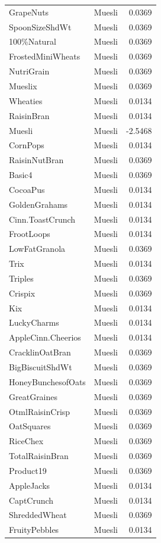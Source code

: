 \begin{longtable}{llr}
GrapeNuts & Muesli & 0.0369 \\
SpoonSizeShdWt & Muesli & 0.0369 \\
100\%Natural & Muesli & 0.0369 \\
FrostedMiniWheats & Muesli & 0.0369 \\
NutriGrain & Muesli & 0.0369 \\
Mueslix & Muesli & 0.0369 \\
Wheaties & Muesli & 0.0134 \\
RaisinBran & Muesli & 0.0134 \\
Muesli & Muesli & -2.5468 \\
CornPops & Muesli & 0.0134 \\
RaisinNutBran & Muesli & 0.0369 \\
Basic4 & Muesli & 0.0369 \\
CocoaPus & Muesli & 0.0134 \\
GoldenGrahams & Muesli & 0.0134 \\
Cinn.ToastCrunch & Muesli & 0.0134 \\
FrootLoops & Muesli & 0.0134 \\
LowFatGranola & Muesli & 0.0369 \\
Trix & Muesli & 0.0134 \\
Triples & Muesli & 0.0369 \\
Crispix & Muesli & 0.0369 \\
Kix & Muesli & 0.0134 \\
LuckyCharms & Muesli & 0.0134 \\
AppleCinn.Cheerios & Muesli & 0.0134 \\
CracklinOatBran & Muesli & 0.0369 \\
BigBiscuitShdWt & Muesli & 0.0369 \\
HoneyBunchesofOats & Muesli & 0.0369 \\
GreatGraines & Muesli & 0.0369 \\
OtmlRaisinCrisp & Muesli & 0.0369 \\
OatSquares & Muesli & 0.0369 \\
RiceChex & Muesli & 0.0369 \\
TotalRaisinBran & Muesli & 0.0369 \\
Product19 & Muesli & 0.0369 \\
AppleJacks & Muesli & 0.0134 \\
CaptCrunch & Muesli & 0.0134 \\
ShreddedWheat & Muesli & 0.0369 \\
FruityPebbles & Muesli & 0.0134 \\

\end{longtable}
